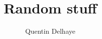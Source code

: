 \newenvironment{defi}[2]
 {\begin{definition}[#1]\label{#2}\end{definition}\begin{siderules}}
 {\end{siderules}}


\renewenvironment{abstract}{%
\begin{center}\begin{minipage}{0.85\textwidth}
\rule{\textwidth}{1pt}}
{\par\noindent\rule{\textwidth}{1pt}\end{minipage}\end{center}}


\makeglossaries



\usepackage{titling}
\setlength{\droptitle}{10em}

\author{Quentin Delhaye}
\date{}
\title{Random stuff}
